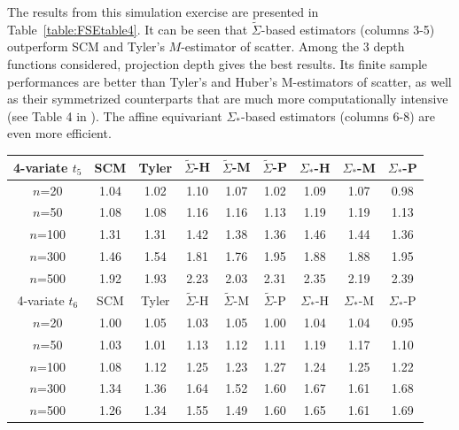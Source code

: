 The results from this simulation exercise are presented in Table~\ref{table:FSEtable4}.
It can be seen that  $\tilde{\Sigma}$-based estimators (columns 3-5) 
outperform SCM and Tyler's $M$-estimator of scatter. Among the 3 depth functions 
considered, projection depth gives the best results. Its finite sample performances are 
better than Tyler's and Huber's M-estimators of scatter, as well as their symmetrized 
counterparts that are much more computationally intensive (see Table 4 in 
\cite{ref:JMVA071611_Sirkiaetal}). The affine equivariant ${\Sigma}_{*}$-based estimators
 (columns 6-8) are even more efficient.

\begin{table}[t]
\begin{center}
\begin{scriptsize}
    \begin{tabular}{c|cc|ccc|ccc}
    \hline
    4-variate $t_5$    & SCM  & Tyler & $\tilde{\Sigma}$-H & $\tilde{\Sigma}$-M & $\tilde{\Sigma}$-P & ${\Sigma}_{*}$-H & ${\Sigma}_{*}$-M & ${\Sigma}_{*}$-P \\ \hline
    $n$=20             & 1.04 & 1.02  & 1.10   & 1.07   & 1.02  & 1.09    & 1.07    & 0.98   \\
    $n$=50             & 1.08 & 1.08  & 1.16   & 1.16   & 1.13  & 1.19    & 1.19    & 1.13   \\
    $n$=100            & 1.31 & 1.31  & 1.42   & 1.38   & 1.36  & 1.46    & 1.44    & 1.36   \\
    $n$=300            & 1.46 & 1.54  & 1.81   & 1.76   & 1.95  & 1.88    & 1.88    & 1.95   \\
    $n$=500            & 1.92 & 1.93  & 2.23   & 2.03   & 2.31  & 2.35    & 2.19    & 2.39   \\ \hline
    4-variate $t_6$     & SCM  & Tyler & $\tilde{\Sigma}$-H & $\tilde{\Sigma}$-M & $\tilde{\Sigma}$-P & ${\Sigma}_{*}$-H & ${\Sigma}_{*}$-M & ${\Sigma}_{*}$-P \\ \hline
    $n$=20             & 1.00 & 1.05  & 1.03   & 1.05   & 1.00  & 1.04    & 1.04    & 0.95   \\
    $n$=50             & 1.03 & 1.01  & 1.13   & 1.12   & 1.11  & 1.19    & 1.17    & 1.10   \\
    $n$=100            & 1.08 & 1.12  & 1.25   & 1.23   & 1.27  & 1.24    & 1.25    & 1.22   \\
    $n$=300            & 1.34 & 1.36  & 1.64   & 1.52   & 1.60  & 1.67    & 1.61    & 1.68   \\
    $n$=500            & 1.26 & 1.34  & 1.55   & 1.49   & 1.60  & 1.65    & 1.61    & 1.69   \\ \hline

\end{tabular}
\end{scriptsize}
\end{center}
\end{table}
